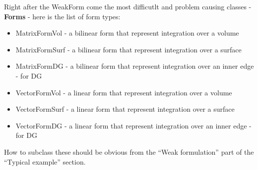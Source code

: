\documentclass[a4paper,0pt,english]{sphinxmanual}
\begin{document}
Right after the WeakForm come the most difficutlt and problem causing classes - \textbf{Forms} - here is the list of form types:
\begin{itemize}
\item {} 
MatrixFormVol - a bilinear form that represent integration over a volume

\item {} 
MatrixFormSurf - a bilinear form that represent integration over a surface

\item {} 
MatrixFormDG - a bilinear form that represent integration over an inner edge - for DG

\item {} 
VectorFormVol - a linear form that represent integration over a volume

\item {} 
VectorFormSurf - a linear form that represent integration over a surface

\item {} 
VectorFormDG - a linear form that represent integration over an inner edge - for DG

\end{itemize}

How to subclass these should be obvious from the ``Weak formulation'' part of the ``Typical example'' section.
\end{document}
